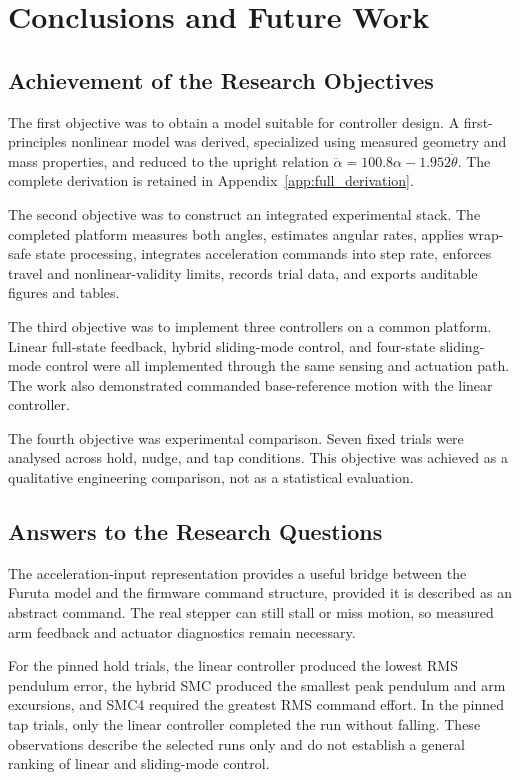 \chapter{Conclusions and Future Work}
\label{ch:conclusions}

\section{Achievement of the Research Objectives}
The first objective was to obtain a model suitable for controller design. A
first-principles nonlinear model was derived, specialized using measured
geometry and mass properties, and reduced to the upright relation
$\ddot{\alpha}=100.8\alpha-1.952\ddot{\theta}$. The complete derivation is
retained in Appendix~\ref{app:full_derivation}.

The second objective was to construct an integrated experimental stack. The
completed platform measures both angles, estimates angular rates, applies
wrap-safe state processing, integrates acceleration commands into step rate,
enforces travel and nonlinear-validity limits, records trial data, and
exports auditable figures and tables.

The third objective was to implement three controllers on a common platform.
Linear full-state feedback, hybrid sliding-mode control, and four-state
sliding-mode control were all implemented through the same sensing and
actuation path. The work also demonstrated commanded base-reference motion
with the linear controller.

The fourth objective was experimental comparison. Seven fixed trials were
analysed across hold, nudge, and tap conditions. This objective was achieved
as a qualitative engineering comparison, not as a statistical evaluation.

\section{Answers to the Research Questions}
The acceleration-input representation provides a useful bridge between the
Furuta model and the firmware command structure, provided it is described as
an abstract command. The real stepper can still stall or miss motion, so
measured arm feedback and actuator diagnostics remain necessary.

For the pinned hold trials, the linear controller produced the lowest RMS
pendulum error, the hybrid SMC produced the smallest peak pendulum and arm
excursions, and SMC4 required the greatest RMS command effort. In the pinned
tap trials, only the linear controller completed the run without falling.
These observations describe the selected runs only and do not establish a
general ranking of linear and sliding-mode control.

